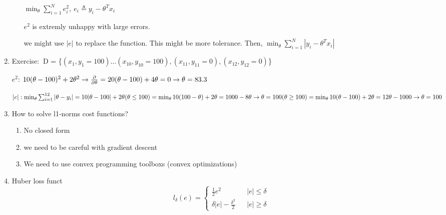 \documentclass[12pt]{article}
\newcommand{\exe}{{\color{green} Exercise: $\ $}}
\begin{document}
\begin{multicols}{2}
\begin{enumerate}
\begin{enumerate}
                $\min_{\theta} \sum_{i = 1}^{N} e_i^2, \ e_i \triangleq y_i - \theta^T x_i$

                $e^2$ is extremly unhappy with large errors.

                we might use $|e|$ to replace the function. This might be more tolerance. Then, $\min_{\theta} \sum_{i = 1}^N |y_i - \theta^T x_i|$
            \end{enumerate}
            
            \item \exe D = \{$(x_1, y_1 = 100) \dots (x_10, y_10 = 100), (x_{11}, y_{11} = 0),  (x_{12}, y_{12} = 0)$\}
            
            $e^2$: $10(\theta - 100)^2 + 2\theta^2 \rightarrow \\ \frac{\partial}{\partial \theta} = 20(\theta - 100) + 4\theta = 0 \rightarrow \\ \theta = 83.3$

            $|e|: \min_{\theta} \sum_{i = 1}^{12} |\theta - y_i|  = 10| \theta - 100 | + 2\theta \\
             (\theta \le 100) = \min_{\theta} 10(100 - \theta) + 2\theta \\
             = 1000 - 8\theta \rightarrow \theta = 100\\
             (\theta \ge 100) = \min_{\theta} 10(\theta - 100) + 2\theta \\
             = 12\theta - 1000 \rightarrow \theta = 100 $
            
             \item How to solve l1-norms cost functions?
             
             \begin{enumerate}
                 \item No closed form
                 \item we need to be careful with gradient descent
                 \item We need to use convex programming toolboxs (convex optimizations)
             \end{enumerate}

             \item Huber loss funct
             $$
                l_{\delta} (e) = \left\{ 
                    \begin{array}{rcl}
                        \frac{1}{2}e^2 & & |e| \le \delta \\
                        \delta |e| - \frac{{\delta}^2}{2} & & |e| \ge \delta
                    \end{array} 
                    \right.
             $$


\end{enumerate}
\end{multicols}
\end{document}

